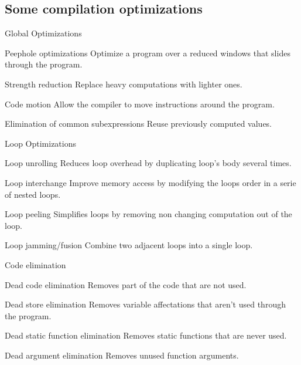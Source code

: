 \documentclass{beamer}
\begin{document}
    \subsection{Some compilation optimizations}
    
    \begin{frame}[<+->]{Global Optimizations}
        \begin{block}{Peephole optimizations}
            Optimize a program over a reduced windows that slides through the program.
        \end{block}
        \begin{block}{Strength reduction}
            Replace heavy computations with lighter ones.
        \end{block}
        \begin{block}{Code motion}
            Allow the compiler to move instructions around the program.
        \end{block}
        \begin{block}{Elimination of common subexpressions}
            Reuse previously computed values.
        \end{block}
    \end{frame}
    
    \begin{frame}[<+->]{Loop Optimizations}
        \begin{block}{Loop unrolling}
            Reduces loop overhead by duplicating loop's body several times.
        \end{block}
        \begin{block}{Loop interchange}
            Improve memory access by modifying the loops order in a serie of nested loops.
        \end{block}
        \begin{block}{Loop peeling}
            Simplifies loops by removing non changing computation out of the loop.
        \end{block}
        \begin{block}{Loop jamming/fusion}
            Combine two adjacent loops into a single loop.
        \end{block}
    \end{frame}
    
    \begin{frame}[<+->]{Code elimination}
        \begin{block}{Dead code elimination}
            Removes part of the code that are not used.
        \end{block}
        \begin{block}{Dead store elimination}
            Removes variable affectations that aren't used through the program.
        \end{block}
        \begin{block}{Dead static function elimination}
            Removes static functions that are never used.
        \end{block}
        \begin{block}{Dead argument elimination}
            Removes unused function arguments.
        \end{block}
    \end{frame}
    
\end{document}
